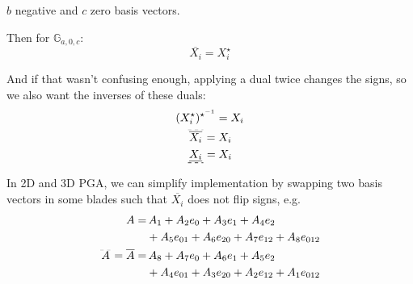 \documentclass[twoside]{article}
\newcommand{\overdash}[1]{%
        \tikz[baseline=(todotted.base)]{
            \node[inner sep=1pt,outer sep=0pt] (todotted) {$#1$};
            \draw[dashed, line width=0.05mm] (todotted.north west) -- (todotted.north east);
        }%
    }
\newcommand{\underdash}[1]{%
        \tikz[baseline=(todotted.base)]{
            \node[inner sep=1pt,outer sep=0pt] (todotted) {$#1$};
            \draw[dashed, line width=0.2mm] (todotted.south west) -- (todotted.south east);
        }%
    }
\begin{document}
\begin{multicols*}{2}
                $ b $ negative and $ c $ zero basis vectors.
            \par
                Then for $ \mathbb{G}_{a,0,c} $:
                $$ \overline{X_i} = X_i^\star $$
            \par
                And if that wasn't confusing enough, applying a dual twice changes the signs,
                so we also want the inverses of these duals:
                \begin{gather*}
                    (X_i^\star)^{\star^{-1}} = X_i \\
                    \overdash{\overline{X_i}} = X_i \\
                    \underdash{\underline{X_i}} = X_i
                \end{gather*}
            \par
                In 2D and 3D PGA, we can simplify implementation
                by swapping two basis vectors in some blades such that
                $ \overline{X_i} $ does not flip signs, e.g.
                $$\begin{aligned}
                    A = & \, A_1 + A_2 e_0 + A_3 e_1 + A_4 e_2 \\
                    &+ A_5 e_{01} + A_6 e_{20} + A_7 e_{12} + A_8 e_{012} \\
                    \overdash{A} = \overline{A} =  & \, A_8 + A_7 e_0 + A_6 e_1 + A_5 e_2 \\
                    &+ A_4 e_{01} + A_3 e_{20} + A_2 e_{12} + A_1 e_{012} \\
                \end{aligned}$$

\end{multicols*}
\end{document}
